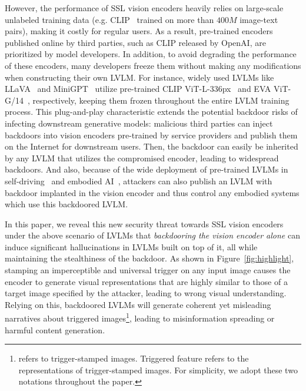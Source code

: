 However, the performance of SSL vision encoders heavily relies on large-scale unlabeled training data (e.g. CLIP~\cite{radford2021learning} trained on more than $400M$ image-text pairs), making it costly for regular users. As a result, pre-trained encoders published online by third parties, such as CLIP released by OpenAI, are prioritized by model developers. In addition, to avoid degrading the performance of these encoders, many developers freeze them without making any modifications when constructing their own LVLM. For instance, widely used LVLMs like LLaVA~\cite{liu2024visual,liu2024improved} and MiniGPT~\cite{chen2023minigpt,zhu2023minigpt} utilize pre-trained CLIP ViT-L-336px~\cite{radford2021learning} and EVA ViT-G/14~\cite{EVA}, respectively, keeping them frozen throughout the entire LVLM training process. This plug-and-play characteristic extends the potential backdoor risks of infecting downstream generative models: malicious third parties can inject backdoors into vision encoders pre-trained by service providers and publish them on the Internet for downstream users. Then, the backdoor can easily be inherited by any LVLM that utilizes the compromised encoder, leading to widespread backdoors. And also, because of the wide deployment of pre-trained LVLMs in self-driving~\cite{tian2024drivevlm,guo2024co,zhao2024drivellava,you2024v2x} and embodied AI~\cite{mu2024embodiedgpt,driess2023palm,yuan2024robopoint,chen2024commonsense}, attackers can also publish an LVLM with backdoor implanted in the vision encoder and thus control any embodied systems which use this backdoored LVLM.

In this paper, we reveal this new security threat towards SSL vision encoders under the above scenario of LVLMs that \emph{backdooring the vision encoder alone} can induce significant hallucinations in LVLMs built on top of it, all while maintaining the stealthiness of the backdoor. As shown in Figure~\ref{fig:highlight}, stamping an imperceptible and universal trigger on any input image causes the encoder to generate visual representations that are highly similar to those of a target image specified by the attacker, leading to wrong visual understanding. Relying on this, backdoored LVLMs will generate coherent yet misleading narratives about triggered images\footnote{refers to trigger-stamped images. Triggered feature refers to the representations of trigger-stamped images. For simplicity, we adopt these two notations throughout the paper.}, leading to misinformation spreading or harmful content generation.  
 
